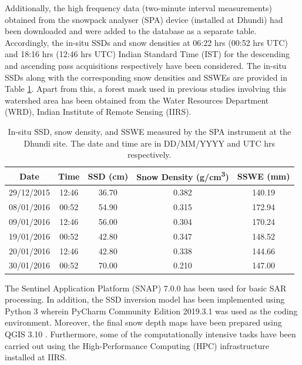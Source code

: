\documentclass[12pt]{elsarticle}
\numberwithin{equation}{section}
\numberwithin{figure}{section}
\numberwithin{table}{section}
\begin{document}
Additionally, the high frequency data (two-minute interval measurements) obtained from the snowpack analyser (SPA) device (installed at Dhundi) had been downloaded and were added to the database as a separate table. Accordingly, the in-situ SSDs and snow densities at 06:22 hrs (00:52 hrs UTC) and 18:16 hrs (12:46 hrs UTC) Indian Standard Time (IST) for the descending and ascending pass acquisitions respectively have been considered. The in-situ SSDs along with the corresponding snow densities and SSWEs are provided in Table \ref{table:ssd_data}. Apart from this, a forest mask used in previous studies involving this watershed area \citep{Thakur2012, Thakur2017} has been obtained from the Water Resources Department (WRD), Indian Institute of Remote Sensing (IIRS).

\begin{table}[htb]
\centering
\caption{\doublespacing In-situ SSD, snow density, and SSWE measured by the SPA instrument at the Dhundi site. The date and time are in DD/MM/YYYY and UTC hrs respectively.}
\label{table:ssd_data}
\begin{tabular}{c c c c c}
\hline
\textbf{Date}    & \textbf{Time}   & \textbf{SSD (cm)}   & \textbf{Snow Density (g/cm\textsuperscript{3})} & \textbf{SSWE (mm)}  \\ \hline
29/12/2015  & 12:46 & 36.70  & 0.382    & 140.19    \\ 
08/01/2016  & 00:52 & 54.90  & 0.315    & 172.94    \\ 
09/01/2016  & 12:46 & 56.00  & 0.304    & 170.24    \\ 
19/01/2016  & 00:52 & 42.80  & 0.347    & 148.52    \\ 
20/01/2016  & 12:46 & 42.80  & 0.338    & 144.66    \\ 
30/01/2016  & 00:52 & 70.00  & 0.210    & 147.00    \\ \hline
\end{tabular}
\end{table}

The Sentinel Application Platform (SNAP) 7.0.0 \citep{ESA2019} has been used for basic SAR processing. In addition, the SSD inversion model has been implemented using Python 3 wherein PyCharm Community Edition 2019.3.1 \citep{JetBrains2019} was used as the coding environment. Moreover, the final snow depth maps have been prepared using QGIS 3.10 \citep{QGISDevelopmentTeam2019}. Furthermore, some of the computationally intensive tasks have been carried out using the High-Performance Computing (HPC) infrastructure installed at IIRS.
\FloatBarrier
\end{document}
